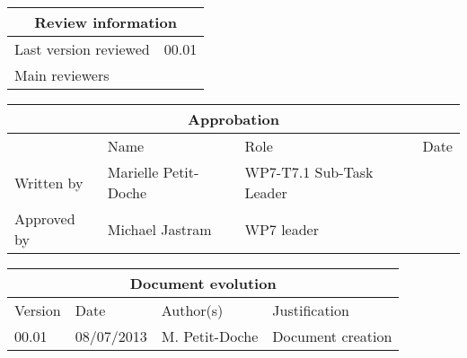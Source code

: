 \documentclass{template/openetcs_report}
\begin{document}
\begin{tabular}{|p{4.4cm}|p{8.7cm}|}
\hline
\multicolumn{2}{|c|}{Review information} \\
\hline
Last version reviewed & 00.01 \\
\hline
Main reviewers &  \\
\hline
\end{tabular}

\begin{tabular}{|p{2.2cm}|p{4cm}|p{4cm}|p{2cm}|}
\hline
\multicolumn{4}{|c|}{Approbation} \\
\hline
  &  Name & Role & Date   \\
\hline  
Written by    &  Marielle Petit-Doche & WP7-T7.1 Sub-Task Leader  & \\
\hline
Approved by & Michael Jastram & WP7 leader & \\
\hline
\end{tabular}

\begin{tabular}{|p{2.2cm}|p{2cm}|p{3cm}|p{5cm}|}
\hline
\multicolumn{4}{|c|}{Document evolution} \\
\hline
Version &  Date & Author(s) & Justification  \\
\hline  
00.01 & 08/07/2013 & M. Petit-Doche &  Document creation  \\
\hline  
\end{tabular}



\newcommand{\tbd}{\colorbox{cyan}{\%\%To Be Defined\%\%}}
\newcommand{\tbc}{\colorbox{cyan}{\%\%To Be Confirmed\%\%}}
\newcommand{\todo}[1]{\colorbox{cyan}{\%\%{#1}\%\%}}
\newlength{\origindent}

\newenvironment{issue}{
        \begin{quote}
        \begin{itshape}Open Issue.
}{
        \end{itshape}
        \end{quote}
}

\newenvironment{comment}{
        \begin{quote}
        \begin{itshape}Comment.
}{
        \end{itshape}
        \end{quote}
}
\end{document}
